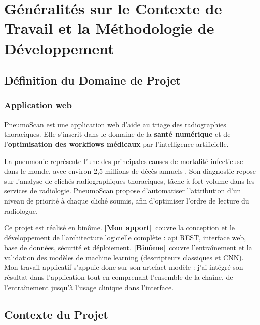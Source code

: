 \documentclass[12pt, a4paper]{report}
\newcommand{\mypart}{\textbf{[Mon apport]}}
\newcommand{\binpart}{\textbf{[Binôme]}}
\begin{document}
\tableofcontents
\newpage
\listoftables
{}
\newpage
{}

\chapter{Généralités sur le Contexte de Travail et la Méthodologie de Développement}

\section{Définition du Domaine de Projet}

\subsection{Application web}

PneumoScan est une application web d'aide au triage des radiographies thoraciques.
Elle s'inscrit dans le domaine de la \textbf{santé numérique} et de
l'\textbf{optimisation des workflows médicaux} par l'intelligence artificielle.

La pneumonie représente l'une des principales causes de mortalité infectieuse dans
le monde, avec environ 2,5 millions de décès annuels \cite{who2022}. Son diagnostic
repose sur l'analyse de clichés radiographiques thoraciques, tâche à fort volume
dans les services de radiologie. PneumoScan propose d'automatiser l'attribution
d'un niveau de priorité à chaque cliché soumis, afin d'optimiser l'ordre de lecture
du radiologue.

\begin{infobox}
Ce projet est réalisé en binôme. \mypart\ couvre la conception et le développement
de l'architecture logicielle complète : \acrshort{api} REST, interface web,
base de données, sécurité et déploiement. \binpart\ couvre l'entraînement
et la validation des modèles de machine learning (descripteurs classiques et CNN).
Mon travail applicatif s'appuie donc sur son artefact modèle : j'ai intégré son
résultat dans l'application tout en comprenant l'ensemble de la chaîne, de
l'entraînement jusqu'à l'usage clinique dans l'interface.
\end{infobox}

\section{Contexte du Projet}
\end{document}

